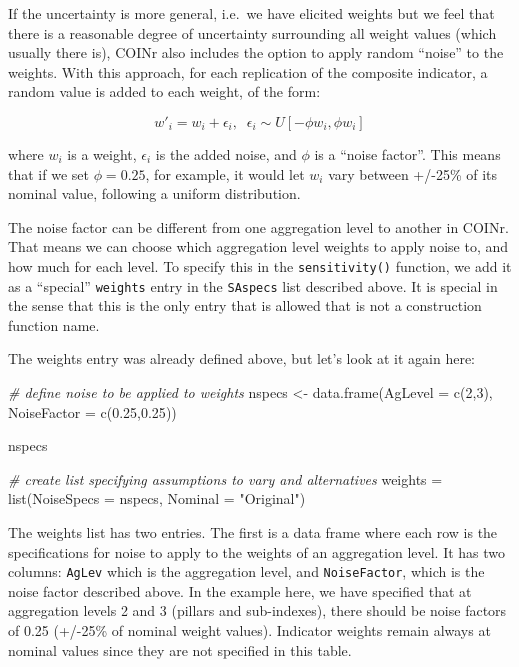 \documentclass[
]{book}
\newenvironment{Shaded}{\begin{snugshade}}{\end{snugshade}}
\newcommand{\AttributeTok}[1]{\textcolor[rgb]{0.77,0.63,0.00}{#1}}
\newcommand{\CommentTok}[1]{\textcolor[rgb]{0.56,0.35,0.01}{\textit{#1}}}
\newcommand{\DecValTok}[1]{\textcolor[rgb]{0.00,0.00,0.81}{#1}}
\newcommand{\FloatTok}[1]{\textcolor[rgb]{0.00,0.00,0.81}{#1}}
\newcommand{\FunctionTok}[1]{\textcolor[rgb]{0.00,0.00,0.00}{#1}}
\newcommand{\NormalTok}[1]{#1}
\newcommand{\OtherTok}[1]{\textcolor[rgb]{0.56,0.35,0.01}{#1}}
\newcommand{\StringTok}[1]{\textcolor[rgb]{0.31,0.60,0.02}{#1}}
\begin{document}
If the uncertainty is more general, i.e.~we have elicited weights but we feel that there is a reasonable degree of uncertainty surrounding all weight values (which usually there is), COINr also includes the option to apply random ``noise'' to the weights. With this approach, for each replication of the composite indicator, a random value is added to each weight, of the form:

\[ w'_i = w_i + \epsilon_i, \; \; \epsilon_i \sim U[-\phi w_i, \phi w_i] \]

where \(w_i\) is a weight, \(\epsilon_i\) is the added noise, and \(\phi\) is a ``noise factor''. This means that if we set \(\phi = 0.25\), for example, it would let \(w_i\) vary between +/-25\% of its nominal value, following a uniform distribution.

The noise factor can be different from one aggregation level to another in COINr. That means we can choose which aggregation level weights to apply noise to, and how much for each level. To specify this in the \texttt{sensitivity()} function, we add it as a ``special'' \texttt{weights} entry in the \texttt{SAspecs} list described above. It is special in the sense that this is the only entry that is allowed that is not a construction function name.

The weights entry was already defined above, but let's look at it again here:

\begin{Shaded}
\begin{Highlighting}[]
\CommentTok{\# define noise to be applied to weights}
\NormalTok{nspecs }\OtherTok{\textless{}{-}} \FunctionTok{data.frame}\NormalTok{(}\AttributeTok{AgLevel =} \FunctionTok{c}\NormalTok{(}\DecValTok{2}\NormalTok{,}\DecValTok{3}\NormalTok{), }\AttributeTok{NoiseFactor =} \FunctionTok{c}\NormalTok{(}\FloatTok{0.25}\NormalTok{,}\FloatTok{0.25}\NormalTok{))}

\NormalTok{nspecs}

\CommentTok{\# create list specifying assumptions to vary and alternatives}
\NormalTok{weights }\OtherTok{=} \FunctionTok{list}\NormalTok{(}\AttributeTok{NoiseSpecs =}\NormalTok{ nspecs,}
               \AttributeTok{Nominal =} \StringTok{"Original"}\NormalTok{)}
\end{Highlighting}
\end{Shaded}

The weights list has two entries. The first is a data frame where each row is the specifications for noise to apply to the weights of an aggregation level. It has two columns: \texttt{AgLev} which is the aggregation level, and \texttt{NoiseFactor}, which is the noise factor described above. In the example here, we have specified that at aggregation levels 2 and 3 (pillars and sub-indexes), there should be noise factors of 0.25 (+/-25\% of nominal weight values). Indicator weights remain always at nominal values since they are not specified in this table.
\end{document}
